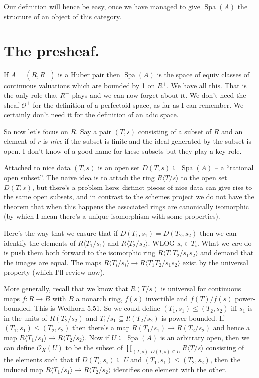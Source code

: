 \documentclass{amsart}
\DeclareMathOperator{\Spa}{Spa}
\theoremstyle{plain}
\theoremstyle{remark}
\begin{document}
Our definition will hence be easy, once we have managed to give $\Spa(A)$ the structure of an object of this category.

\section{The presheaf.}

If $A=(R,R^+)$ is a Huber pair then $\Spa(A)$ is the space of equiv classes of continuous valuations which are bounded by 1 on $R^+$. We have all this. That is the only role that $R^+$ plays and we can now forget about it. We don't need the sheaf $\mathcal{O}^+$ for the definition of a perfectoid space, as far as I can remember. We certainly don't need it for the definition of an adic space.

So now let's focus on $R$. Say a pair $(T,s)$ consisting of a subset of $R$ and an element of $r$ is \emph{nice} if the subset is finite and the ideal generated by the subset is open. I don't know of a good name for these subsets but they play a key role.

Attached to nice data $(T,s)$ is an open set $D(T,s)\subseteq\Spa(A)$ -- a ``rational open subset''. The naive idea is to attach the ring $R\langle T/s\rangle$ to the open set $D(T,s)$, but there's a problem here: distinct pieces of nice data can give rise to the same open subsets, and in contrast to the schemes project we do not have the theorem that when this happens the associated rings are canonically isomorphic (by which I mean there's a unique isomorphism with some properties). 

Here's the way that we ensure that if $D(T_1,s_1)=D(T_2,s_2)$ then we can identify the elements of $R\langle T_1/s_1\rangle$ and $R\langle T_2/s_2\rangle$. WLOG $s_i\in T_i$. What we \emph{can} do is push them both forward to the isomorphic ring $R\langle T_1T_2/s_1s_2\rangle$ and demand that the images are equal. The maps $R\langle T_i/s_i\rangle\to R\langle T_1T_2/s_1s_2\rangle$ exist by the universal property (which I'll review now).

More generally, recall that we know that $R(T/s)$ is universal for continuous maps $f:R\to B$ with $B$ a nonarch ring, $f(s)$ invertible and $f(T)/f(s)$ power-bounded. This is Wedhorn 5.51. So we could define $(T_1,s_1)\leq(T_2,s_2)$ iff $s_1$ is in the units of $R(T_2/s_2)$ and $T_1/s_1\subseteq R(T_2/s_2)$ is power-bounded. If $(T_1,s_1)\leq(T_2,s_2)$ then there's a map $R(T_1/s_1)\to R(T_2/s_2)$ and hence a map $R\langle T_1/s_1\rangle\to R\langle T_2/s_2\rangle$. Now if $U\subseteq\Spa(A)$ is an arbitrary open, then we can define $\mathcal{O}_X(U)$ to be the subset of $\prod_{(T,s):D(T,s)\subseteq U}R\langle T/s\rangle$ consisting of the elements such that if $D(T_i,s_i)\subseteq U$ and $(T_1,s_1)\leq (T_2,s_2)$, then the induced map $R\langle T_1/s_1\rangle \to R\langle T_2/s_2\rangle$ identifies one element with the other.
\end{document}
